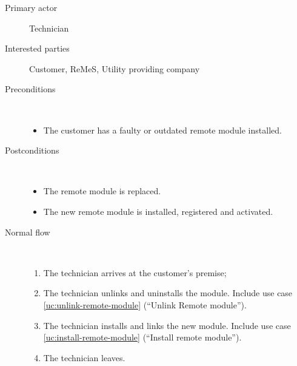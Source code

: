 \begin{description}
	\item[Primary actor] Technician
	\item[Interested parties] Customer, ReMeS, Utility providing company
	\item[Preconditions] \ 
	\begin{itemize}
		\item The customer has a faulty or outdated remote module installed.
	\end{itemize}
	\item[Postconditions] \ 
	\begin{itemize}
		\item The remote module is replaced.
		\item The new remote module is installed, registered and activated. 
	\end{itemize}
	\item[Normal flow] \ 
	\begin{enumerate}
	  	\item The technician arrives at the customer's premise;
	  	\item The technician unlinks and uninstalls the module. Include use case
	  	\ref{uc:unlink-remote-module} (``Unlink Remote module'').
	  	\item The technician installs and links the new module. Include use case
	  	\ref{uc:install-remote-module} (``Install remote module''). 
	  	\item The technician leaves.
	\end{enumerate}
\end{description}